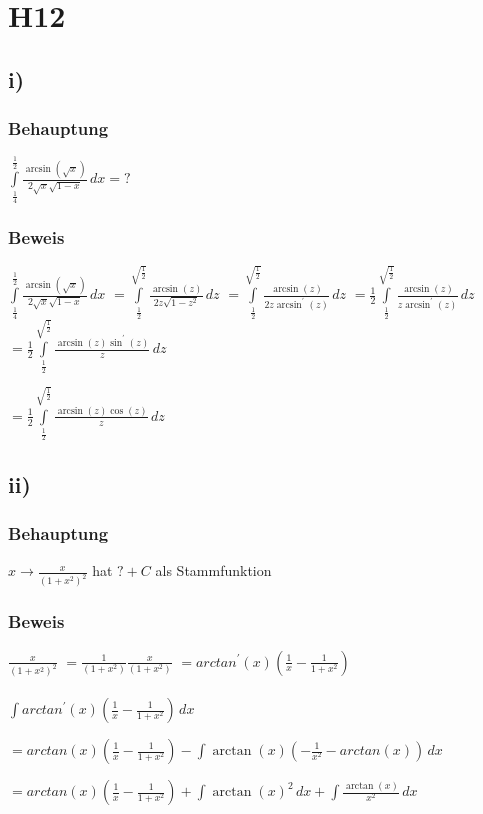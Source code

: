 \section*{H12}

\subsection*{i)}

\subsubsection*{Behauptung}

$\int\limits^{\frac{1}{2}}_{\frac{1}{4}} \frac{\arcsin(\sqrt{x})}{2\sqrt{x}\sqrt{1-x}}\,dx = ?$

\subsubsection*{Beweis}

$\int\limits^{\frac{1}{2}}_{\frac{1}{4}} \frac{\arcsin(\sqrt{x})}{2\sqrt{x}\sqrt{1-x}}\,dx$
$ = \int\limits^{\sqrt{\frac{1}{2}}}_{\frac{1}{2}} \frac{\arcsin(z)}{2z\sqrt{1-z^{2}}}\,dz$
$ = \int\limits^{\sqrt{\frac{1}{2}}}_{\frac{1}{2}} \frac{\arcsin(z)}{2z\arcsin^{\prime}(z)}\,dz$
$ = \frac{1}{2} \int\limits^{\sqrt{\frac{1}{2}}}_{\frac{1}{2}} \frac{\arcsin(z)}{z\arcsin^{\prime}(z)}\,dz$
$ = \frac{1}{2} \int\limits^{\sqrt{\frac{1}{2}}}_{\frac{1}{2}} 
	\frac{\arcsin(z)\sin^{\prime}(z)}{z}\,dz$
	
$ = \frac{1}{2} \int\limits^{\sqrt{\frac{1}{2}}}_{\frac{1}{2}} 
	\frac{\arcsin(z)\cos(z)}{z}\,dz$


\subsection*{ii)}

\subsubsection*{Behauptung}

$x \to \frac{x}{(1+x^{2})^2}$ hat $ ? + C$ als Stammfunktion

\subsubsection*{Beweis}

$   \frac{x}{(1+x^{2})^2} $
$ = \frac{1}{(1+x^{2})}\frac{x}{(1+x^{2})}$
$ = arctan^{\prime}(x)(\frac{1}{x}-\frac{1}{1+x^{2}})$

\paragraph*{}

$\int arctan^{\prime}(x)(\frac{1}{x}-\frac{1}{1+x^{2}}) \,dx$

$ = arctan(x)(\frac{1}{x}-\frac{1}{1+x^{2}}) - \int \arctan(x) (-\frac{1}{x^{2}}-arctan(x))\,dx $


$ = arctan(x)(\frac{1}{x}-\frac{1}{1+x^{2}}) 
+ \int \arctan(x)^{2}\,dx 
+ \int\frac{\arctan(x)}{x^{2}}\,dx $

